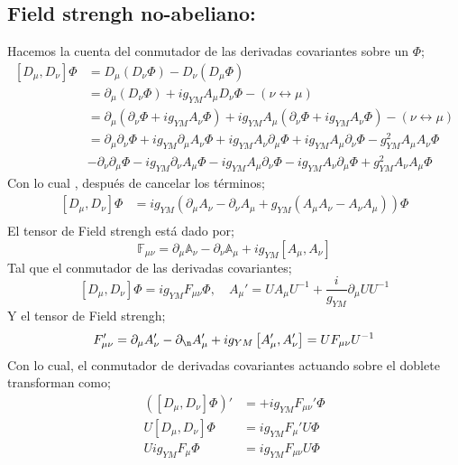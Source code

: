\documentclass[../main.tex]{subfiles}
\begin{document}
\subsection{Field strengh no-abeliano:}
Hacemos la cuenta del conmutador de las derivadas covariantes sobre un $\Phi$;
\begin{align*}
  \left[ D_\mu , D_\nu \right] \Phi & = D_\mu \left( D_\nu \Phi \right)  - D_\nu \left( D_\mu \Phi \right) \\
  & = \partial_\mu \left( D_\nu \Phi \right) + i g_{YM} A_\mu D_\nu \Phi - \left( \nu \leftrightarrow \mu \right) \\
  & = \partial_\mu \left( \partial_\nu \Phi + ig_{YM} A_\nu \Phi \right) + ig_{YM} A_\mu \left( \partial_\nu \Phi + ig_{YM} A_\nu \Phi \right)  - \left( \nu \leftrightarrow \mu \right) \\
  & = \partial_\mu \partial_\nu \Phi + i g_{YM} \partial_\mu A_\nu \Phi + i g_{YM} A_\nu \partial_\mu \Phi + i g_{YM} A_\mu \partial_\nu \Phi - g^2_{YM} A_\mu A_\nu \Phi \\ &- \partial_\nu \partial_\mu \Phi - ig_{YM} \partial_\nu A_\mu \Phi - i g_{YM} A_\mu \partial_\nu \Phi - i g_{YM} A_\nu \partial_\mu \Phi + g^2_{YM} A_\nu A_\mu \Phi
\end{align*}
Con lo cual , después de cancelar los términos;
\begin{align*}
  \left[ D_\mu , D_\nu \right] \Phi & = ig_{YM} \left( \partial_\mu A_\nu - \partial_\nu A_\mu + g_{YM} \left( A_\mu A_\nu - A_\nu A_\mu \right) \right) \Phi \\
\end{align*}
El tensor de Field strengh está dado por;
\begin{equation}
  \mathbb{F}_{\mu\nu} = \partial_\mu \mathbb{A}_\nu - \partial_\nu \mathbb{A}_\mu + ig_{YM} \left[ A_\mu , A_\nu \right]
 \end{equation}
Tal que el conmutador de las derivadas covariantes;
\begin{equation}
  \left[ D_\mu , D_\nu  \right]\Phi = ig_{YM} F_{\mu\nu} \Phi, \quad A_\mu'=UA_\mu U^{-1}+ \frac{i}{g_{YM}} \partial_\mu U U^{-1}
 \end{equation}
 Y el tensor de Field strengh;
 \begin{equation}
   F_{\mu\nu}'= \partial_\mu A_\nu' - \partial_\n A_\mu' + ig_{YM}\left[ A_\mu',A_\nu' \right] = U F_{\mu\nu}U^{-1}
  \end{equation}
Con lo cual, el conmutador de derivadas covariantes actuando sobre el doblete transforman como;
\begin{align*}
  \left( \left[ D_\mu , D_\nu  \right]\Phi \right)' & = +ig_{YM} F_{\mu\nu}' \Phi \\
  U \left[ D_\mu , D_\nu \right]\Phi & = ig_{YM} F_{\mu}' U \Phi \\
  U ig_{YM} F_{\mu} \Phi & = i g_{YM} F_{\mu \nu} U \Phi
\end{align*}
\end{document}

